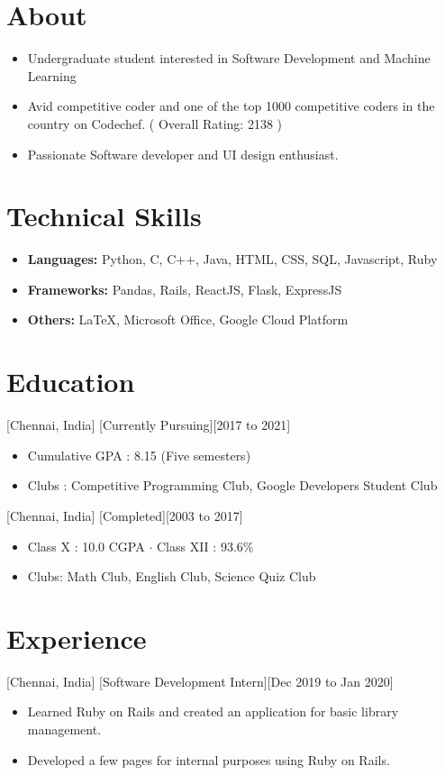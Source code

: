 \documentclass{article}
\date{Aug 2020}
\begin{document}
\makecvtitle

\section{About}
\begin{itemize}
\item Undergraduate student interested in Software Development and Machine Learning
\item Avid competitive coder and one of the top 1000 competitive coders in the country on Codechef. ( Overall Rating: 2138 ) 
\item Passionate Software developer and UI design enthusiast.
\end{itemize}
 
\section{Technical Skills}

\begin{itemize}
\item \textbf{Languages:} Python, C, C++, Java, HTML, CSS, SQL, Javascript, Ruby
\item \textbf{Frameworks:} Pandas, Rails, ReactJS, Flask, ExpressJS
\item \textbf{Others:} LaTeX, Microsoft Office, Google Cloud Platform
\end{itemize}


\section{Education}
[Chennai, India]
[Currently Pursuing][2017 to 2021]
\begin{itemize}
\item Cumulative GPA : 8.15 (Five semesters)
\item Clubs : Competitive Programming Club, Google Developers Student Club
\end{itemize}
[Chennai, India]
[Completed][2003 to 2017]
\begin{itemize}
\item Class X : 10.0 CGPA $\cdot$ Class XII : 93.6\%
\item Clubs: Math Club, English Club, Science Quiz Club
\end{itemize}


 
\section{Experience}
[Chennai, India]
[Software Development Intern][Dec 2019 to Jan 2020]
\begin{itemize}
\item Learned Ruby on Rails and created an application for basic library management.
\item Developed a few pages for internal purposes using Ruby on Rails.
\end{itemize}
\end{document}
